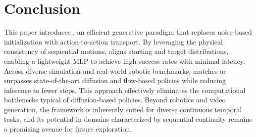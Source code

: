 

\section{Conclusion}
This paper introduces \m{}, an efficient generative paradigm that replaces noise-based initialization with action-to-action transport. By leveraging the physical consistency of sequential motions, \m{} aligns starting and target distributions, enabling a lightweight MLP to achieve high success rates with minimal latency. Across diverse simulation and real-world robotic benchmarks, \m{} matches or surpasses state-of-the-art diffusion and flow-based policies while reducing inference to fewer steps. This approach effectively eliminates the computational bottlenecks typical of diffusion-based policies. Beyond robotics and video generation, the framework is inherently suited for diverse continuous temporal tasks, and its potential in domains characterized by sequential continuity remains a promising avenue for future exploration.



